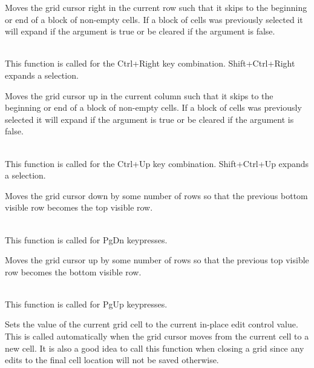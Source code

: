 \label{wxgridmovecursorrightblock}


Moves the grid cursor right in the current row such that it skips to the beginning or
end of a block of non-empty cells. If a block of cells was previously selected it
will expand if the argument is true or be cleared if the argument is false.

\\
This function is called for the Ctrl+Right key combination. Shift+Ctrl+Right expands a selection.

\label{wxgridmovecursorupblock}


Moves the grid cursor up in the current column such that it skips to the beginning or
end of a block of non-empty cells. If a block of cells was previously selected it
will expand if the argument is true or be cleared if the argument is false.

\\
This function is called for the Ctrl+Up key combination. Shift+Ctrl+Up expands a selection.

\label{wxgridmovepagedown}


Moves the grid cursor down by some number of rows so that the previous bottom visible row
becomes the top visible row.

\\
This function is called for PgDn keypresses.

\label{wxgridmovepageup}


Moves the grid cursor up by some number of rows so that the previous top visible row
becomes the bottom visible row.

\\
This function is called for PgUp keypresses.

\label{wxgridsaveeditcontrolvalue}


Sets the value of the current grid cell to the current in-place edit control value.
This is called automatically when the grid cursor moves from the current cell to a
new cell. It is also a good idea to call this function when closing a grid since
any edits to the final cell location will not be saved otherwise.


